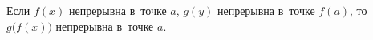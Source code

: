 
Если $f(x)$ непрерывна в~точке $a$, $g(y)$ непрерывна в~точке $f(a)$, то $g\big(f(x)\big)$ непрерывна в~точке $a$.
